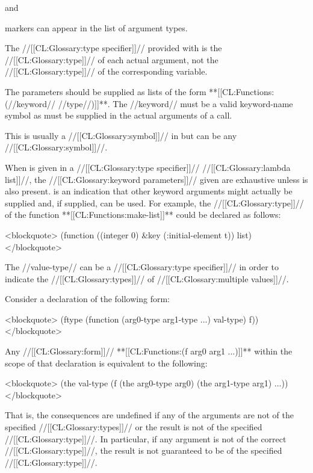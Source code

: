 and 

markers can appear in the list of argument types.

The //[[CL:Glossary:type specifier]]// provided with  is the //[[CL:Glossary:type]]// of each actual argument, not the //[[CL:Glossary:type]]// of the corresponding variable.



The  parameters should be supplied as lists of the form **[[CL:Functions:(//keyword// //type//)]]**. The //keyword// must be a valid keyword-name symbol as must be supplied in the actual arguments of a call.

This is usually a //[[CL:Glossary:symbol]]// in  but can be any //[[CL:Glossary:symbol]]//.

When  is given in a  //[[CL:Glossary:type specifier]]// //[[CL:Glossary:lambda list]]//, the //[[CL:Glossary:keyword parameters]]// given are exhaustive unless  is also present.  is an indication that other keyword arguments might actually be supplied and, if supplied, can be used. For example, the //[[CL:Glossary:type]]// of the function **[[CL:Functions:make-list]]** could be declared as follows:

<blockquote> (function ((integer 0) &key (:initial-element t)) list) </blockquote>

The //value-type// can be a  //[[CL:Glossary:type specifier]]// in order to indicate the //[[CL:Glossary:types]]// of //[[CL:Glossary:multiple values]]//.

Consider a declaration of the following form:

<blockquote> (ftype (function (arg0-type arg1-type ...) val-type) f)) </blockquote>

Any //[[CL:Glossary:form]]// **[[CL:Functions:(f arg0 arg1 ...)]]** within the scope of that declaration is equivalent to the following:

<blockquote> (the val-type (f (the arg0-type arg0) (the arg1-type arg1) ...)) </blockquote>

That is, the consequences are undefined if any of the arguments are not of the specified //[[CL:Glossary:types]]// or the result is not of the specified //[[CL:Glossary:type]]//. In particular, if any argument is not of the correct //[[CL:Glossary:type]]//, the result is not guaranteed to be of the specified //[[CL:Glossary:type]]//.

